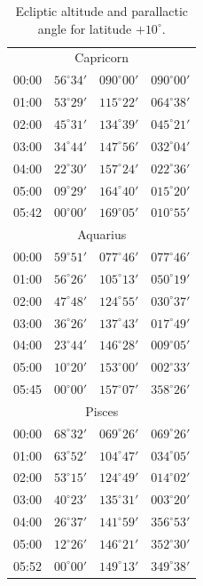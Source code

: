 \begin{table}[!h]
\begin{Parallel}{}{}
{{\begin{tabular}{l|lll}
\multicolumn{4}{c}{Capricorn}\\
00:00 & $56^\circ 34'$ & $090^\circ 00'$ & $090^\circ 00'$\\
01:00 & $53^\circ 29'$ & $115^\circ 22'$ & $064^\circ 38'$\\
02:00 & $45^\circ 31'$ & $134^\circ 39'$ & $045^\circ 21'$\\
03:00 & $34^\circ 44'$ & $147^\circ 56'$ & $032^\circ 04'$\\
04:00 & $22^\circ 30'$ & $157^\circ 24'$ & $022^\circ 36'$\\
05:00 & $09^\circ 29'$ & $164^\circ 40'$ & $015^\circ 20'$\\
05:42 & $00^\circ 00'$ & $169^\circ 05'$ & $010^\circ 55'$\\
\multicolumn{4}{c}{Aquarius}\\
00:00 & $59^\circ 51'$ & $077^\circ 46'$ & $077^\circ 46'$\\
01:00 & $56^\circ 26'$ & $105^\circ 13'$ & $050^\circ 19'$\\
02:00 & $47^\circ 48'$ & $124^\circ 55'$ & $030^\circ 37'$\\
03:00 & $36^\circ 26'$ & $137^\circ 43'$ & $017^\circ 49'$\\
04:00 & $23^\circ 44'$ & $146^\circ 28'$ & $009^\circ 05'$\\
05:00 & $10^\circ 20'$ & $153^\circ 00'$ & $002^\circ 33'$\\
05:45 & $00^\circ 00'$ & $157^\circ 07'$ & $358^\circ 26'$\\
\multicolumn{4}{c}{Pisces}\\
00:00 & $68^\circ 32'$ & $069^\circ 26'$ & $069^\circ 26'$\\
01:00 & $63^\circ 52'$ & $104^\circ 47'$ & $034^\circ 05'$\\
02:00 & $53^\circ 15'$ & $124^\circ 49'$ & $014^\circ 02'$\\
03:00 & $40^\circ 23'$ & $135^\circ 31'$ & $003^\circ 20'$\\
04:00 & $26^\circ 37'$ & $141^\circ 59'$ & $356^\circ 53'$\\
05:00 & $12^\circ 26'$ & $146^\circ 21'$ & $352^\circ 30'$\\
05:52 & $00^\circ 00'$ & $149^\circ 13'$ & $349^\circ 38'$\\
\end{tabular}
}}
\end{Parallel}
\caption{Ecliptic altitude and parallactic angle for latitude $+10^\circ$.}\label{tscorp}
\end{table}

